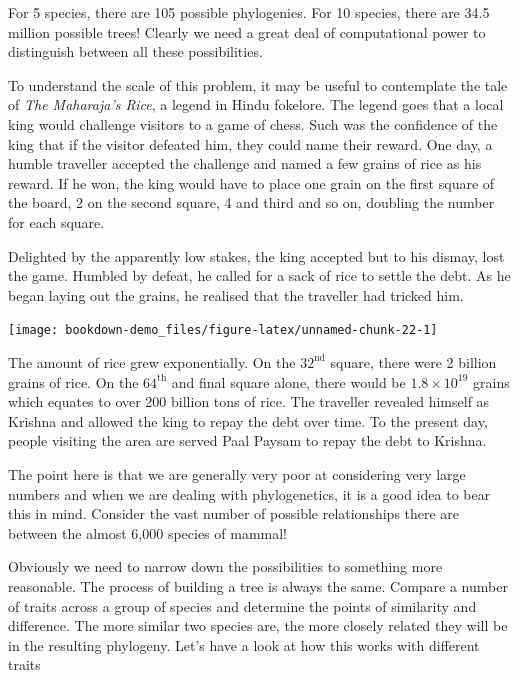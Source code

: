 \documentclass[
]{book}
\begin{document}
For 5 species, there are 105 possible phylogenies. For 10 species, there are 34.5 million possible trees! Clearly we need a great deal of computational power to distinguish between all these possibilities.

To understand the scale of this problem, it may be useful to contemplate the tale of \emph{The Maharaja's Rice}, a legend in Hindu fokelore. The legend goes that a local king would challenge visitors to a game of chess. Such was the confidence of the king that if the visitor defeated him, they could name their reward. One day, a humble traveller accepted the challenge and named a few grains of rice as his reward. If he won, the king would have to place one grain on the first square of the board, 2 on the second square, 4 and third and so on, doubling the number for each square.

Delighted by the apparently low stakes, the king accepted but to his dismay, lost the game. Humbled by defeat, he called for a sack of rice to settle the debt. As he began laying out the grains, he realised that the traveller had tricked him.

\begin{center}\texttt{[image: bookdown-demo\_files/figure-latex/unnamed-chunk-22-1]} \end{center}

The amount of rice grew exponentially. On the \(\text{32}^{\text{nd}}\) square, there were 2 billion grains of rice. On the \(\text{64}^{\text{th}}\) and final square alone, there would be \(1.8 \times 10^{19}\) grains which equates to over 200 billion tons of rice. The traveller revealed himself as Krishna and allowed the king to repay the debt over time. To the present day, people visiting the area are served Paal Paysam to repay the debt to Krishna.

The point here is that we are generally very poor at considering very large numbers and when we are dealing with phylogenetics, it is a good idea to bear this in mind. Consider the vast number of possible relationships there are between the almost 6,000 species of mammal!

Obviously we need to narrow down the possibilities to something more reasonable. The process of building a tree is always the same. Compare a number of traits across a group of species and determine the points of similarity and difference. The more similar two species are, the more closely related they will be in the resulting phylogeny. Let's have a look at how this works with different traits
\end{document}
